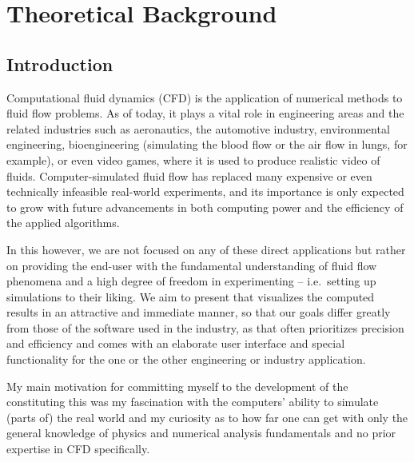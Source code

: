 \documentclass[11pt,a4paper,twoside,openright]{report}
\begin{document}


\setcounter{tocdepth}{2}
\tableofcontents

\chapter{Theoretical Background}
\pagestyle{fancy}

\section{Introduction}
Computational fluid dynamics (CFD) is the application of numerical methods to fluid flow problems. As of today, it plays a vital role in engineering areas and the related industries such as aeronautics, the automotive industry, environmental engineering, bioengineering (simulating the blood flow or the air flow in lungs, for example), or even video games, where it is used to produce realistic video of fluids. Computer-simulated fluid flow has replaced many expensive or even technically infeasible real-world experiments, and its importance is only expected to grow with future advancements in both computing power and the efficiency of the applied algorithms.

In this \this{} however, we are not focused on any of these direct applications but rather on providing the end-user with the fundamental understanding of fluid flow phenomena and a high degree of freedom in experimenting -- i.e.\ setting up simulations to their liking. We aim to present \software{} that visualizes the computed results in an attractive and immediate manner, so that our goals differ greatly from those of the software used in the industry, as that often prioritizes precision and efficiency and comes with an elaborate user interface and special functionality for the one or the other engineering or industry application.

My main motivation for committing myself to the development of the \software{} constituting this \this{} was my fascination with the computers' ability to simulate (parts of) the real world and my curiosity as to how far one can get with only the general knowledge of physics and numerical analysis fundamentals and no prior expertise in CFD specifically.
\end{document}
